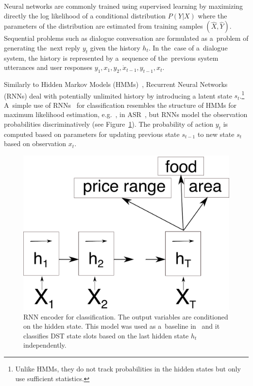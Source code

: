 \documentclass[11pt]{article}
\begin{document}
Neural networks are commonly trained using supervised learning by maximizing directly the log likelihood of a conditional distribution $ P(Y| X) $ where the parameters of the distribution are estimated from training samples $ (\hat{X}, \hat{Y}) $.
Sequential problems such as dialogue conversation are formulated as a~problem of generating the~next reply $y_t$ given the history $h_t$.
In the~case of a~dialogue system, the history is represented by a~sequence of the~previous system utterances and user responses $ y_1, x_1, y_2, \dot x_{t-1}, y_{t-1}, x_t $.

Similarly to Hidden Markov Models (HMMs)~\cite{huang_hidden_1990}, Recurrent Neural Networks (RNNs) deal with potentially unlimited history by introducing a latent state $s_t$.\footnote{Unlike HMMs, they do not track probabilities in the hidden states but only use sufficient statistics.}
A~simple use of  RNNs~\cite{gers_learning_2000} for classification resembles the structure of HMMs for maximum likelihood estimation, e.g.\ , in ASR~\cite{huang_hidden_1990}, but RNNs model the observation probabilities discriminatively (see Figure~\ref{fig:encoder}).
The probability of action $ y_t $ is computed based on parameters for updating previous state $s_{t-1}$ to new state $s_t$ based on observation $x_t$.

\begin{figure}[htb]
    \centering
    \includegraphics[width=0.8\linewidth]{encoder}
    \caption{RNN encoder for classification. The output variables are conditioned on the hidden state. 
    This model was used as a~baseline in~\cite{platek_recurrent_2016} and it classifies DST state slots based on the last hidden state $h_t$ independently.}
\label{fig:encoder}
\end{figure}
\end{document}
